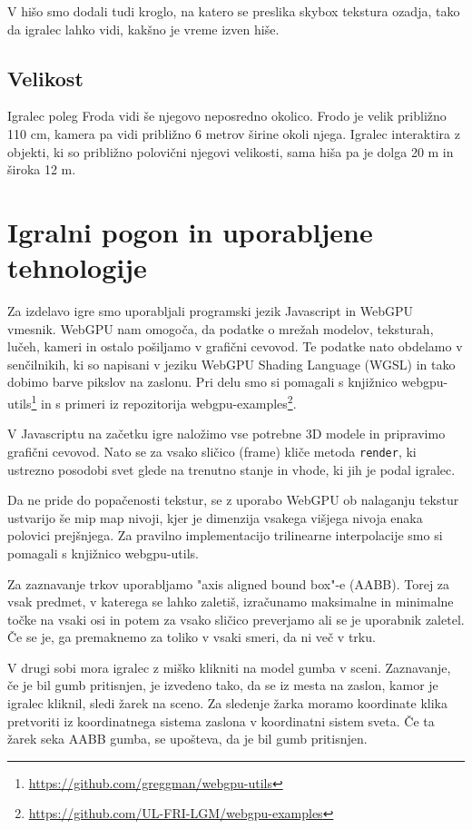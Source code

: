 \documentclass[a4paper,12pt]{article}
\begin{document}
V hišo smo dodali tudi kroglo, na katero se preslika skybox tekstura ozadja, tako da igralec lahko vidi, kakšno je vreme izven hiše.

\subsection{Velikost}
Igralec poleg Froda vidi še njegovo neposredno okolico. Frodo je velik približno 110 cm, kamera pa vidi približno 6 metrov širine okoli njega. Igralec interaktira z objekti, ki so približno polovični njegovi velikosti, sama hiša pa je dolga 20 m in široka 12 m.


\section{Igralni pogon in uporabljene tehnologije}
Za izdelavo igre smo uporabljali programski jezik Javascript in WebGPU vmesnik. WebGPU nam omogoča, da podatke o mrežah modelov, teksturah, lučeh, kameri in ostalo pošiljamo v grafični cevovod. Te podatke nato obdelamo v senčilnikih, ki so napisani v jeziku WebGPU Shading Language (WGSL) in tako dobimo barve pikslov na zaslonu. Pri delu smo si pomagali s knjižnico webgpu-utils\footnote{\url{https://github.com/greggman/webgpu-utils}} in s primeri iz repozitorija webgpu-examples\footnote{\url{https://github.com/UL-FRI-LGM/webgpu-examples}}.

V Javascriptu na začetku igre naložimo vse potrebne 3D modele in pripravimo grafični cevovod. Nato se za vsako sličico (frame) kliče metoda \verb+render+, ki ustrezno posodobi svet glede na trenutno stanje in vhode, ki jih je podal igralec.

Da ne pride do popačenosti tekstur, se z uporabo WebGPU ob nalaganju tekstur ustvarijo še mip map nivoji, kjer je dimenzija vsakega višjega nivoja enaka polovici prejšnjega. Za pravilno implementacijo trilinearne interpolacije smo si pomagali s knjižnico webgpu-utils.

Za zaznavanje trkov uporabljamo "axis aligned bound box"-e (AABB). Torej za vsak predmet, v katerega se lahko zaletiš, izračunamo maksimalne in minimalne točke na vsaki osi in potem za vsako sličico preverjamo ali se je uporabnik zaletel. Če se je, ga premaknemo za toliko v vsaki smeri, da ni več v trku.

V drugi sobi mora igralec z miško klikniti na model gumba v sceni. Zaznavanje, če je bil gumb pritisnjen, je izvedeno tako, da se iz mesta na zaslon, kamor je igralec kliknil, sledi žarek na sceno. Za sledenje žarka moramo koordinate klika pretvoriti iz koordinatnega sistema zaslona v koordinatni sistem sveta. Če ta žarek seka AABB gumba, se upošteva, da je bil gumb pritisnjen.
\end{document}
